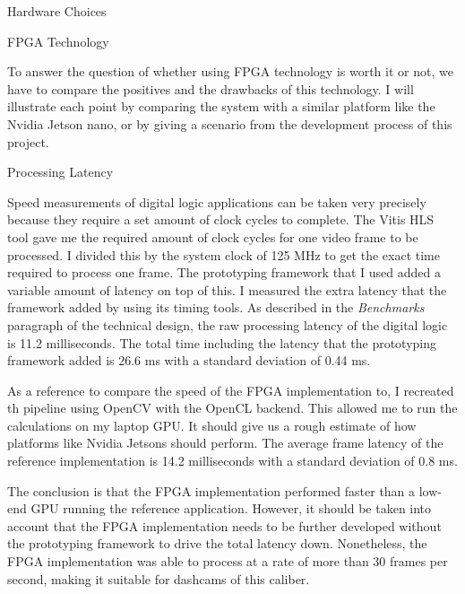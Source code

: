\documentclass{matthijs}
\begin{document}
	\begin{hoofdstuk}{Hardware Choices}
	
		\begin{paragraaf}{FPGA Technology}

			To answer the question of whether using FPGA technology is worth it or not, we have to compare the positives and the drawbacks of this technology.
			I will illustrate each point by comparing the system with a similar platform like the Nvidia Jetson nano, or by giving a scenario from the development process of this project.

			\begin{subparagraaf}{Processing Latency}

				Speed measurements of digital logic applications can be taken very precisely because they require a set amount of clock cycles to complete.
				The Vitis HLS tool gave me the required amount of clock cycles for one video frame to be processed.
				I divided this by the system clock of 125 MHz to get the exact time required to process one frame.
				The prototyping framework that I used added a variable amount of latency on top of this.
				I measured the extra latency that the framework added by using its timing tools.
				As described in the \textit{Benchmarks} paragraph of the technical design, the raw processing latency of the digital logic is 11.2 milliseconds.
				The total time including the latency that the prototyping framework added is 26.6 ms with a standard deviation of 0.44 ms.

				\bigskip

				As a reference to compare the speed of the FPGA implementation to, I recreated th pipeline using OpenCV with the OpenCL backend.
				This allowed me to run the calculations on my laptop GPU.
				It should give us a rough estimate of how platforms like Nvidia Jetsons should perform.
				The average frame latency of the reference implementation is 14.2 milliseconds with a standard deviation of 0.8 ms.

				\bigskip

				The conclusion is that the FPGA implementation performed faster than a low-end GPU running the reference application.
				However, it should be taken into account that the FPGA implementation needs to be further developed without the prototyping framework to drive the total latency down.
				Nonetheless, the FPGA implementation was able to process at a rate of more than 30 frames per second, making it suitable for dashcams of this caliber.


\end{subparagraaf}
\end{paragraaf}
\end{hoofdstuk}
\end{document}
